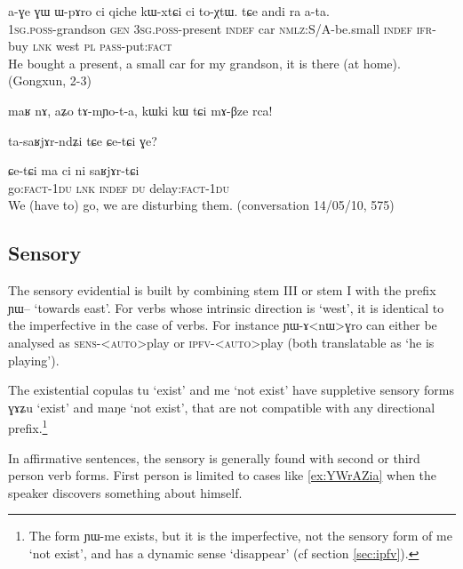 \documentclass[oldfontcommands,oneside,a4paper,11pt]{article}
\newcommand{\ipa}[1]{{\phon \mbox{#1}}} %
\newcommand{\factual}[1]{\textsc{:fact}}
\begin{document}
   \begin{exe}
\ex \label{ex:ata}
\gll
 \ipa{a-ɣe}  	\ipa{ɣɯ}  	\ipa{ɯ-pɤro}  	\ipa{ci}  	 qiche 	\ipa{kɯ-xtɕi}  	\ipa{ci}  	\ipa{to-χtɯ.}  	\ipa{tɕe}  	\ipa{andi}  	\ipa{ra}  	\ipa{a-ta.}  	\\
 \textsc{1sg.poss}-grandson \textsc{gen} \textsc{3sg.poss}-present \textsc{indef} car \textsc{nmlz}:S/A-be.small \textsc{indef} \textsc{ifr}-buy \textsc{lnk} west \textsc{pl} \textsc{pass}-put\factual{} \\
 \glt He bought a present, a small car for my grandson, it is there (at home). (Gongxun, 2-3)
  \end{exe}


\ipa{maʁ}  	\ipa{nɤ,}  	\ipa{aʑo}  	\ipa{tɤ-mɲo-t-a,}  	\ipa{kɯki}  	\ipa{kɯ}  	\ipa{tɕi}  	\ipa{mɤ-βze}  	\ipa{rca!}  


\ipa{ta-saʁjɤr-ndʑi} 	\ipa{tɕe} 	\ipa{ɕe-tɕi} 	\ipa{ɣe?} 

\begin{exe}
\ex \label{ex:saRjArtCi}
\gll
  \ipa{ɕe-tɕi}  	\ipa{ma}  	\ipa{ci}  	\ipa{ni}  	\ipa{saʁjɤr-tɕi}  \\
  go\factual{}-\textsc{1du} \textsc{lnk} \textsc{indef} \textsc{du}   delay\factual{}-\textsc{1du} \\
\glt  We (have to) go, we are disturbing them. (conversation 14/05/10, 575)
\end{exe}
 
 \subsection{Sensory } \label{sec:sens}
The sensory evidential is built by combining stem III or stem I with the prefix \ipa{ɲɯ--} `towards east'.  For verbs whose intrinsic direction is `west', it is identical to the imperfective in the case of verbs. For instance \ipa{ɲɯ-ɤ<nɯ>ɣro} can either be analysed as \textsc{sens-<auto>}play or \textsc{ipfv-<auto>}play (both translatable as `he is playing').


The existential copulas \ipa{tu} `exist' and \ipa{me} `not exist' have suppletive sensory forms \ipa{ɣɤʑu} `exist'  and \ipa{maŋe} `not exist', that are not compatible with any directional prefix.\footnote{The form \ipa{ɲɯ-me} exists, but it is the imperfective, not the sensory form of \ipa{me} `not exist', and has a dynamic sense `disappear' (cf section \ref{sec:ipfv}). }

In affirmative sentences, the sensory is generally found with second or third person verb forms. First person is limited to  cases like \ref{ex:YWrAZia} when the speaker discovers something about himself.
\end{document}
